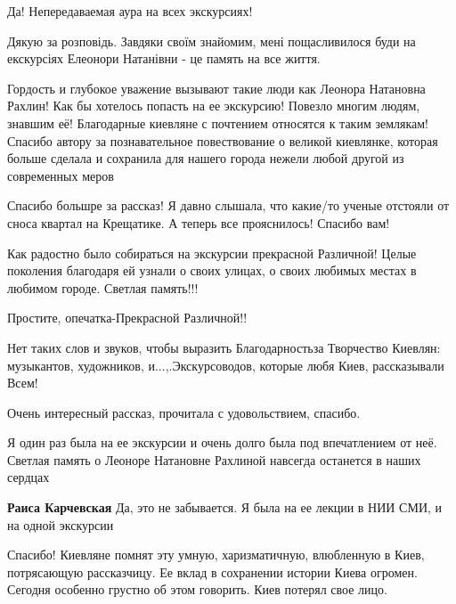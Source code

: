 \begin{itemize}
Да! Непередаваемая аура на всех экскурсиях!

Дякую за розповідь. Завдяки своїм знайомим, мені пощасливилося буди на екскурсіях Елеонори Натанівни - це память на все життя.


Гордость и глубокое уважение вызывают такие люди как Леонора Натановна Рахлин!
Как бы хотелось попасть на ее экскурсию! Повезло многим людям, знавшим её!
Благодарные киевляне с почтением относятся к таким землякам! Спасибо автору за
познавательное повествование о великой киевлянке, которая больше сделала и
сохранила для нашего города нежели любой другой из современных меров


Спасибо большре за рассказ! Я давно слышала, что какие/то ученые отстояли от
сноса квартал на Крещатике. А теперь все прояснилось! Спасибо вам!


Как радостно было собираться на экскурсии прекрасной Различной! Целые поколения
благодаря ей узнали о своих улицах, о своих любимых местах в любимом
городе. Светлая память!!!


Простите, опечатка-Прекрасной Различной!!


Нет таких слов и звуков, чтобы выразить Благодарностьза Творчество Киевлян:
музыкантов, художников, и...,.Экскурсоводов, которые любя Киев, рассказывали
Всем!

Очень интересный рассказ, прочитала с удовольствием, спасибо.


Я один раз была на ее экскурсии и очень долго была под впечатлением от неё.
Светлая память о Леоноре Натановне Рахлиной навсегда останется в наших сердцах

\begin{itemize} %
\textbf{Раиса Карчевская} Да, это не забывается. Я была на ее лекции в НИИ СМИ, и на одной экскурсии
\end{itemize} %


Спасибо! Киевляне помнят эту умную, харизматичную, влюбленную в Киев,
потрясающую рассказчицу. Ее вклад в сохранении истории Киева огромен. Сегодня
особенно грустно об этом говорить. Киев потерял свое лицо.


\end{itemize}

